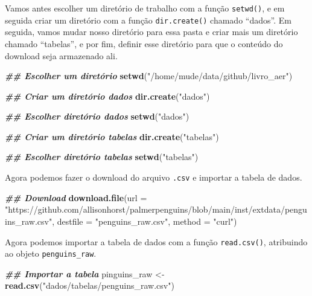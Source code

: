 \documentclass[
]{article}
\newenvironment{Shaded}{\begin{snugshade}}{\end{snugshade}}
\newcommand{\AttributeTok}[1]{\textcolor[rgb]{0.13,0.29,0.53}{#1}}
\newcommand{\DocumentationTok}[1]{\textcolor[rgb]{0.56,0.35,0.01}{\textbf{\textit{#1}}}}
\newcommand{\FunctionTok}[1]{\textcolor[rgb]{0.13,0.29,0.53}{\textbf{#1}}}
\newcommand{\NormalTok}[1]{#1}
\newcommand{\OtherTok}[1]{\textcolor[rgb]{0.56,0.35,0.01}{#1}}
\newcommand{\StringTok}[1]{\textcolor[rgb]{0.31,0.60,0.02}{#1}}
\begin{document}
Vamos antes escolher um diretório de trabalho com a função \texttt{setwd()}, e em seguida criar um diretório com a função \texttt{dir.create()} chamado ``dados''. Em seguida, vamos mudar nosso diretório para essa pasta e criar mais um diretório chamado ``tabelas'', e por fim, definir esse diretório para que o conteúdo do download seja armazenado ali.

\begin{Shaded}
\begin{Highlighting}[]
\DocumentationTok{\#\# Escolher um diretório}
\FunctionTok{setwd}\NormalTok{(}\StringTok{"/home/mude/data/github/livro\_aer"}\NormalTok{)}

\DocumentationTok{\#\# Criar um diretório \textquotesingle{}dados\textquotesingle{}}
\FunctionTok{dir.create}\NormalTok{(}\StringTok{"dados"}\NormalTok{)}

\DocumentationTok{\#\# Escolher diretório \textquotesingle{}dados\textquotesingle{}}
\FunctionTok{setwd}\NormalTok{(}\StringTok{"dados"}\NormalTok{)}

\DocumentationTok{\#\# Criar um diretório \textquotesingle{}tabelas\textquotesingle{}}
\FunctionTok{dir.create}\NormalTok{(}\StringTok{"tabelas"}\NormalTok{)}

\DocumentationTok{\#\# Escolher diretório \textquotesingle{}tabelas\textquotesingle{}}
\FunctionTok{setwd}\NormalTok{(}\StringTok{"tabelas"}\NormalTok{)}
\end{Highlighting}
\end{Shaded}

Agora podemos fazer o download do arquivo \texttt{.csv} e importar a tabela de dados.

\begin{Shaded}
\begin{Highlighting}[]
\DocumentationTok{\#\# Download}
\FunctionTok{download.file}\NormalTok{(}\AttributeTok{url =} \StringTok{"https://github.com/allisonhorst/palmerpenguins/blob/main/inst/extdata/penguins\_raw.csv"}\NormalTok{,}
              \AttributeTok{destfile =} \StringTok{"penguins\_raw.csv"}\NormalTok{, }\AttributeTok{method =} \StringTok{"curl"}\NormalTok{)}
\end{Highlighting}
\end{Shaded}

Agora podemos importar a tabela de dados com a função \texttt{read.csv()}, atribuindo ao objeto \texttt{penguins\_raw}.

\begin{Shaded}
\begin{Highlighting}[]
\DocumentationTok{\#\# Importar a tabela}
\NormalTok{pinguins\_raw }\OtherTok{\textless{}{-}} \FunctionTok{read.csv}\NormalTok{(}\StringTok{"dados/tabelas/penguins\_raw.csv"}\NormalTok{)}
\end{Highlighting}
\end{Shaded}
\end{document}
